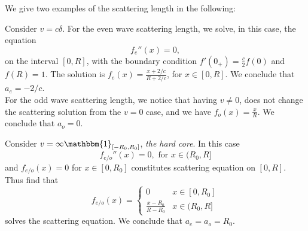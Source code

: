 We give two examples of the scattering length in the following:
\begin{example}\label{ExampleScatteringLengthDelta}
	Consider $ v=c\delta $. For the even wave scattering length, we solve, in this case, the equation \begin{equation}
	f_e''(x)=0,
	\end{equation}
	on the interval $ [0,R] $, with the boundary condition $ f'(0_+)=\frac{c}{2}f(0) $ and $ f(R)=1 $.
	The solution is $ f_e(x)=\frac{x+2/c}{R+2/c} $, for $ x\in[0,R] $. We conclude that $ a_e=-2/c $.\\
	For the odd wave scattering length, we notice that having $ v\neq 0 $, does not change the scattering solution from the $ v=0 $ case, and we have $ f_o(x)=\frac{x}{R} $. We conclude that $ a_o=0 $.
\end{example}
\begin{example}\label{ExampleScatteringLengthHardCore}
	Consider $ v=\infty\mathbbm{1}_{[-R_0,R_0]} $, \ie \emph{the hard core}. In this case \begin{equation}
	f_{e/o}''(x)=0,\text{ for } x\in(R_0,R]
	\end{equation}
	and $ f_{e/o}(x)=0 $ for $ x\in [0,R_0] $ constitutes scattering equation on $ [0,R] $. Thus find that \begin{equation}
	f_{e/o}(x)=\begin{cases}
	0& x\in[0,R_0]\\
	\frac{x-R_0}{R-R_0}& x\in(R_0,R]
	\end{cases}
	\end{equation}
	solves the scattering equation. We conclude that $ a_e=a_o=R_0 $.
\end{example}

